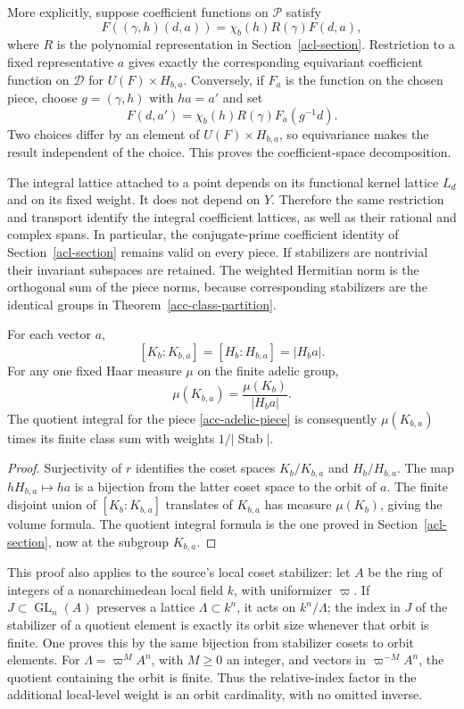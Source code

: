 More explicitly, suppose coefficient functions on $\mathscr P$ satisfy
\[
 F((\gamma,h)(d,a))=\chi_b(h)R(\gamma)F(d,a),
\]
where $R$ is the polynomial representation in
Section~\ref{acl-section}.  Restriction to a fixed representative $a$
gives exactly the corresponding equivariant coefficient function on
$\mathscr D$ for $U(F)\times H_{b,a}$.
Conversely, if $F_a$ is the function on the chosen piece, choose
$g=(\gamma,h)$ with $ha=a'$ and set
\[
 F(d,a')=\chi_b(h)R(\gamma)F_a(g^{-1}d).
\]
Two choices differ by an element of $U(F)\times H_{b,a}$,
so equivariance makes the result independent of the choice.
This proves the coefficient-space decomposition.

The integral lattice attached to a point depends on its functional
kernel lattice $L_d$ and on its fixed weight.  It does not depend on
$Y$.  Therefore the same restriction and transport identify the
integral coefficient lattices, as well as their rational and complex
spans.  In particular, the conjugate-prime coefficient identity of
Section~\ref{acl-section} remains valid on every piece.
If stabilizers are nontrivial their invariant subspaces are retained.
The weighted Hermitian norm is the orthogonal sum of the piece norms,
because corresponding stabilizers are the identical groups in
Theorem~\ref{acc-class-partition}.

\begin{proposition}\label{acc-index-volume}
For each vector $a$,
\[
 [K_b:K_{b,a}]=[H_b:H_{b,a}]=|H_ba|.
\]
For any one fixed Haar measure $\mu$ on the finite adelic group,
\[
                     \mu(K_{b,a})=\frac{\mu(K_b)}{|H_ba|}.
\]
The quotient integral for the piece
\eqref{acc-adelic-piece} is consequently
$\mu(K_{b,a})$ times its finite class sum with weights
$1/|\operatorname{Stab}|$.
\end{proposition}

\begin{proof}
Surjectivity of $r$ identifies the coset spaces
$K_b/K_{b,a}$ and $H_b/H_{b,a}$.
The map $hH_{b,a}\mapsto ha$ is a bijection from the latter
coset space to the orbit of $a$.
The finite disjoint union of $[K_b:K_{b,a}]$ translates of
$K_{b,a}$ has measure $\mu(K_b)$, giving the volume formula.
The quotient integral formula is the one proved in
Section~\ref{acl-section}, now at the subgroup $K_{b,a}$.
\end{proof}

This proof also applies to the source's local coset stabilizer:
let $A$ be the ring of integers of a nonarchimedean local field $k$,
with uniformizer $\varpi$.  If $J\subset\operatorname{GL}_n(A)$
preserves a lattice $\Lambda\subset k^n$, it acts on $k^n/\Lambda$; the index in $J$ of the
stabilizer of a quotient element is exactly its orbit size whenever
that orbit is finite.  One proves this by the same bijection from
stabilizer cosets to orbit elements.  For $\Lambda=\varpi^M A^n$, with $M\geq0$ an integer, and
vectors in $\varpi^{-M}A^n$, the quotient containing the orbit is finite.
Thus the relative-index factor in the additional local-level weight
is an orbit cardinality, with no omitted inverse.

